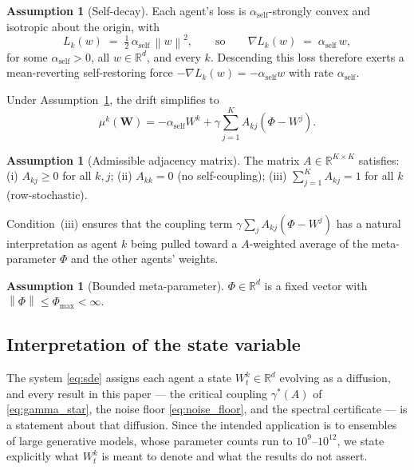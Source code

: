 \documentclass[12pt]{article}
\theoremstyle{plain}
\theoremstyle{definition}
\newtheorem{assumption}[theorem]{Assumption}
\newcommand{\R}{\mathbb{R}}
\newcommand{\W}{\mathbf{W}}
\newcommand{\norm}[1]{\left\lVert #1 \right\rVert}
\newcommand{\loss}{L}
\begin{document}
\begin{assumption}[Self-decay]
  \label{ass:loss}
  Each agent's loss is $\alpha_{\mathrm{self}}$-strongly convex and isotropic
  about the origin, with
  \[
    \loss_k(w) \;=\; \tfrac{1}{2}\,\alpha_{\mathrm{self}}\,\norm{w}^2,
    \qquad\text{so}\qquad
    \nabla \loss_k(w) \;=\; \alpha_{\mathrm{self}}\, w ,
  \]
  for some $\alpha_{\mathrm{self}} > 0$, all $w \in \R^d$, and every $k$.
  Descending this loss therefore exerts a mean-reverting self-restoring force
  $-\nabla\loss_k(w) = -\alpha_{\mathrm{self}}w$ with rate $\alpha_{\mathrm{self}}$.
\end{assumption}

Under Assumption~\ref{ass:loss}, the drift simplifies to
\begin{equation}
  \mu^k(\W) = -\alpha_{\mathrm{self}} W^k +
  \gamma \sum_{j=1}^K A_{kj}(\Phi - W^j).
  \label{eq:drift_simple}
\end{equation}

\begin{assumption}[Admissible adjacency matrix]
  \label{ass:A}
  The matrix $A \in \R^{K \times K}$ satisfies:
  (i) $A_{kj} \geq 0$ for all $k, j$;
  (ii) $A_{kk} = 0$ (no self-coupling);
  (iii) $\sum_{j=1}^K A_{kj} = 1$ for all $k$ (row-stochastic).
\end{assumption}

Condition~(iii) ensures that the coupling term
$\gamma \sum_j A_{kj}(\Phi - W^j)$ has a natural interpretation as
agent $k$ being pulled toward a $A$-weighted average of the
meta-parameter $\Phi$ and the other agents' weights.

\begin{assumption}[Bounded meta-parameter]
  \label{ass:phi}
  $\Phi \in \R^d$ is a fixed vector with $\norm{\Phi} \leq \Phi_{\max}
  < \infty$.
\end{assumption}


\subsection{Interpretation of the state variable}
\label{sec:state_interpretation}

The system \eqref{eq:sde} assigns each agent a state $W^k_t\in\R^d$ evolving as a diffusion, and
every result in this paper --- the critical coupling $\gamma^*(A)$ of \eqref{eq:gamma_star}, the
noise floor \eqref{eq:noise_floor}, and the spectral certificate --- is a statement about that
diffusion. Since the intended application is to ensembles of large generative models, whose
parameter counts run to $10^{9}$--$10^{12}$, we state explicitly what $W^k_t$ is meant to denote
and what the results do not assert.
\end{document}
